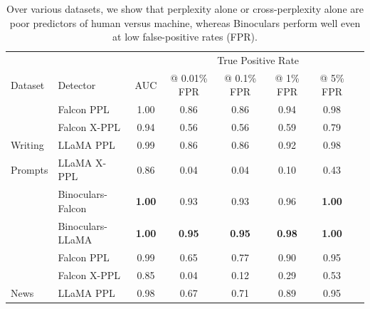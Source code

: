 \documentclass{article} %
\begin{document}
\begin{table}[ht!]
\caption{Over various datasets, we show that perplexity alone or cross-perplexity alone are poor predictors of human versus machine, whereas Binoculars perform well even at low false-positive rates (FPR).}
\label{tab:ppl-v-xppl-results}
\footnotesize
\centering
  \begin{tabular}{llcccccc}
    \toprule
                 & & & \multicolumn{4}{c}{True Positive Rate} \\
        Dataset  &           Detector &            AUC &    @ 0.01\% FPR &     @ 0.1\% FPR &      @ 1\% FPR &      @ 5\% FPR \\ %
    \midrule
                 &         Falcon PPL &           1.00 &            0.86 &            0.86 &           0.94 &           0.98 \\ %
                 &       Falcon X-PPL &           0.94 &            0.56 &            0.56 &           0.59 &           0.79 \\ %
        Writing  &          LLaMA PPL &           0.99 &            0.86 &            0.86 &           0.92 &           0.98 \\ %
         Prompts &        LLaMA X-PPL &           0.86 &            0.04 &            0.04 &           0.10 &           0.43 \\ %
                 &  Binoculars-Falcon &  \textbf{1.00} &            0.93 &            0.93 &           0.96 &  \textbf{1.00} \\ %
                 &   Binoculars-LLaMA &  \textbf{1.00} &   \textbf{0.95} &   \textbf{0.95} &  \textbf{0.98} &  \textbf{1.00} \\ %
    \midrule
                 &         Falcon PPL &           0.99 &            0.65 &            0.77 &           0.90 &           0.95 \\ %
                 &       Falcon X-PPL &           0.85 &            0.04 &            0.12 &           0.29 &           0.53 \\ %
         News    &          LLaMA PPL &           0.98 &            0.67 &            0.71 &           0.89 &           0.95 \\ %

\end{tabular}
\end{table}
\end{document}
